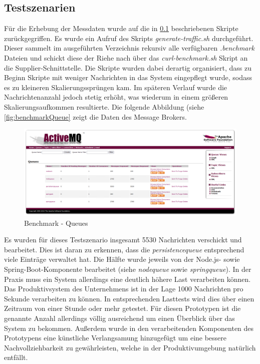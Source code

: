 \subsection{Testszenarien \checkmark}
Für die Erhebung der Messdaten wurde auf die in \ref{}  beschriebenen Skripte zurückgegriffen. Es wurde ein Aufruf des Skripts \emph{generate-traffic.sh} durchgeführt. Dieser sammelt im ausgeführten Verzeichnis rekursiv alle verfügbaren \emph{.benchmark} Dateien und schickt diese der Riehe nach über das \emph{curl-benchmark.sh} Skript an die Supplier-Schnittstelle. Die Skripte wurden dabei derartig organisiert, dass zu Beginn Skripte mit weniger Nachrichten in das System eingepflegt wurde, sodass es zu kleineren Skalierungssprüngen kam. Im späteren Verlauf wurde die Nachrichtenanzahl jedoch stetig erhöht, was wiederum in einem größeren Skalierungsaufkommen resultierte. Die folgende Abbildung (siehe \ref{fig:benchmarkQueue} zeigt die Daten des Message Brokers. 

\begin{figure}[ht!]
	\centering
	\includegraphics[width=\linewidth]{kapitel/problemloesung/implementierung/_img/benchmark-queues}
	\caption[Benchmark - Queues]{Benchmark - Queues}
	\label{fig:benchmarkQueues}
\end{figure}

Es wurden für dieses Testszenario insgesamt 5530 Nachrichten verschickt und bearbeitet. Dies ist daran zu erkennen, dass die \emph{persistencequeue} entsprechend viele Einträge verwaltet hat. Die Hälfte wurde jeweils von der Node.js- sowie Spring-Boot-Komponente bearbeitet (siehe \emph{nodequeue} sowie \emph{springqueue}). In der Praxis muss ein System allerdings eine deutlich höhere Last verarbeiten können. Das Produktivsystem des Unternehmens ist in der Lage 1000 Nachrichten pro Sekunde verarbeiten zu können. In entsprechenden Lasttests wird dies über einen Zeitraum von einer Stunde oder mehr getestet. Für diesen Prototypen ist die genannte Anzahl allerdings völlig ausreichend um einen Überblick über das System zu bekommen. Außerdem wurde in den verarbeitenden Komponenten des Prototypens eine künstliche Verlangsamung hinzugefügt um eine bessere Nachvollziehbarkeit zu gewährleisten, welche in der Produktivumgebung natürlich entfällt.

